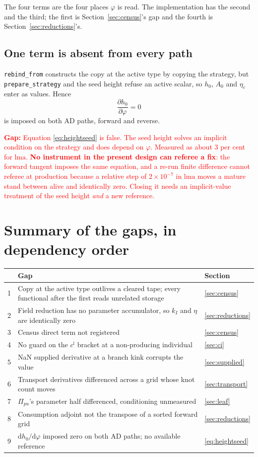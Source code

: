 \documentclass[11pt,a4paper]{article}
\newcommand{\code}[1]{\texttt{\small #1}}
\newcommand{\dd}[2]{\frac{\partial #1}{\partial #2}}
\newcommand{\gap}[1]{\textcolor{red}{\textbf{Gap:} #1}}
\begin{document}
The four terms are the four places $\varphi$ is read. The implementation has the
second and the third; the first is Section~\ref{sec:census}'s gap and the fourth
is Section~\ref{sec:reductions}'s.

\subsection{One term is absent from every path}

\code{rebind\_from} constructs the copy at the active type by copying the
strategy, but \code{prepare\_strategy} and the seed height refuse an active
scalar, so $h_0$, $A_0$ and $\eta_c$ enter as values. Hence
\begin{equation}
\dd{h_0}{\varphi} = 0
\label{eq:heightseed}
\end{equation}
is imposed on both AD paths, forward and reverse.

\gap{Equation \eqref{eq:heightseed} is false. The seed height solves an implicit
condition on the strategy and does depend on $\varphi$. Measured as about $3$ per
cent for $\mathrm{lma}$. \textbf{No instrument in the present design can referee a
fix}: the forward tangent imposes the same equation, and a re-run finite difference
cannot referee at production because a relative step of $2\times 10^{-7}$ in
$\mathrm{lma}$ moves a mature stand between alive and identically zero. Closing it
needs an implicit-value treatment of the seed height \emph{and} a new reference.}

\section{Summary of the gaps, in dependency order}

\begin{longtable}{@{}rp{}l@{}}
\toprule
& Gap & Section \\
\midrule
1 & Copy at the active type outlives a cleared tape; every functional after the
    first reads unrelated storage & \ref{sec:census} \\
2 & Field reduction has no parameter accumulator, so $k_I$ and $\eta$ are
    identically zero & \ref{sec:reductions} \\
3 & Census direct term not registered & \ref{sec:census} \\
4 & No guard on the $c^{\mathrm{i}}$ bracket at a non-producing individual &
    \ref{sec:ci} \\
5 & NaN supplied derivative at a branch kink corrupts the value &
    \ref{sec:supplied} \\
6 & Transport derivatives differenced across a grid whose knot count moves &
    \ref{sec:transport} \\
7 & $\Pi_{pu}$'s parameter half differenced, conditioning unmeasured &
    \ref{sec:leaf} \\
8 & Consumption adjoint not the transpose of a sorted forward grid &
    \ref{sec:reductions} \\
9 & $\mathrm{d}h_0/\mathrm{d}\varphi$ imposed zero on both AD paths; no
    available reference & \ref{eq:heightseed} \\
\bottomrule
\end{longtable}
\end{document}
